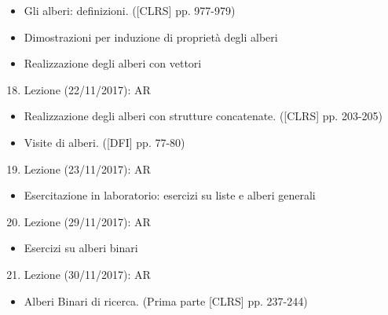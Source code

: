 \documentclass{article}
\providecommand{\tightlist}{%
  \setlength{\itemsep}{0pt}\setlength{\parskip}{0pt}}
\begin{document}
\begin{itemize}
\tightlist
\item
  {Gli alberi: definizioni. ({[}CLRS{]} pp. 977-979)}
\item
  {Dimostrazioni per induzione di proprietà degli alberi}
\item
  {Realizzazione degli alberi con vettori}
\end{itemize}

\begin{enumerate}
\setcounter{enumi}{17}
\tightlist
\item
  {Lezione (22/11/2017): AR}
\end{enumerate}

\begin{itemize}
\tightlist
\item
  {Realizzazione degli alberi con strutture concatenate. ({[}CLRS{]} pp.
  203-205)}
\item
  {Visite di alberi. ({[}DFI{]} pp. 77-80)}
\end{itemize}

\begin{enumerate}
\setcounter{enumi}{18}
\tightlist
\item
  {Lezione (23/11/2017): AR}
\end{enumerate}

\begin{itemize}
\tightlist
\item
  {Esercitazione in laboratorio: esercizi su liste e alberi generali}
\end{itemize}

\begin{enumerate}
\setcounter{enumi}{19}
\tightlist
\item
  {Lezione (29/11/2017): AR}
\end{enumerate}

\begin{itemize}
\tightlist
\item
  {Esercizi su alberi binari}
\end{itemize}

\begin{enumerate}
\setcounter{enumi}{20}
\tightlist
\item
  {Lezione (30/11/2017): AR}
\end{enumerate}

\begin{itemize}
\tightlist
\item
  {Alberi Binari di ricerca. (Prima parte {[}CLRS{]} pp. 237-244)}
\end{itemize}
\end{document}
